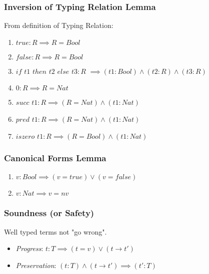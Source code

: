\documentclass{beamer}
\begin{document}
\begin{frame}[fragile]

\frametitle {Inversion of Typing Relation {\color{black}Lemma}}

From definition of Typing Relation:

\begin{enumerate}
\item {$true:R \implies R=Bool$}
\item {$false:R \implies R=Bool$}
\item {$if$} {$ t1 $} {$then$} {$ t2 $} {$else$} {$ t3:R $} {$ \implies (t1:Bool)\land(t2:R)\land(t3:R) $}
\item {$0:R \implies R=Nat$}
\item {$succ$} {$ t1:R \implies (R=Nat) \land (t1:Nat)$}
\item {$pred$} {$ t1:R \implies (R=Nat) \land (t1:Nat)$}
\item {$iszero$} {$ t1:R \implies (R=Bool) \land (t1:Nat)$}
\end{enumerate}

\end{frame}

\begin{frame}[fragile]

\frametitle {Canonical Forms {\color{black}Lemma}}

\begin{enumerate}
\item {$v:Bool \implies (v=true) \lor (v=false)$}
\item {$v:Nat \implies v=nv $}
\end{enumerate}

\end{frame}

\begin{frame}[fragile]

  \frametitle {Soundness (or Safety)}

  Well typed terms not "go wrong".

  \begin{itemize}
  \item \textit{Progress}: {$t:T \implies (t=v) \lor (t \rightarrow t')$}
  \item \textit{Preservation}: {$(t:T)\land(t\rightarrow t') \implies (t':T)$}
  \end{itemize}

\end{frame}

\begin{frame}
 \titlepage
\end{frame}
\end{document}

